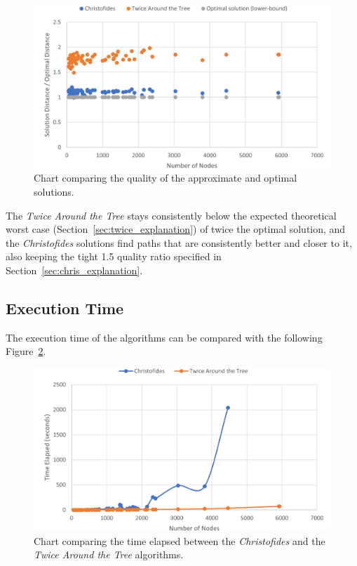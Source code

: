 \documentclass[12pt]{article}
\begin{document}
\begin{figure}[ht]
\centering
\includegraphics[height=.325\textheight]{images/quality_ratio.png}
\caption{Chart comparing the quality of the approximate and optimal solutions.}
\label{fig:quality_ratio}
\end{figure}

The \textit{Twice Around the Tree} stays consistently below the expected theoretical worst case (Section~\ref{sec:twice_explanation}) of 
twice the optimal solution, and the \textit{Christofides} solutions find paths that are consistently better and closer to it, 
also keeping the tight 1.5 quality ratio specified in Section~\ref{sec:chris_explanation}.

\subsection{Execution Time} \label{sec:exp_time}

The execution time of the algorithms can be compared with the following Figure~\ref{fig:exec_time}.

\begin{figure}[ht]
\centering
\includegraphics[height=.325\textheight]{images/execution_time_comparison.png}
\caption{Chart comparing the time elapsed between the \textit{Christofides} and the \textit{Twice Around the Tree} algorithms.}
\label{fig:exec_time}
\end{figure}
\end{document}
